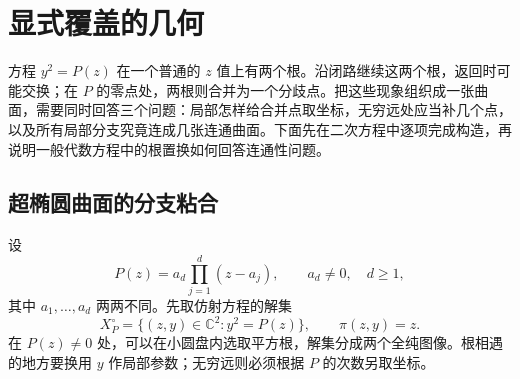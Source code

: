 
% 
% 
% 

\section{显式覆盖的几何}
\label{g4:sec:0204}

方程 \(y^2=P(z)\) 在一个普通的 \(z\) 值上有两个根。沿闭路继续这两个根，返回时可能交换；在 \(P\) 的零点处，两根则合并为一个分歧点。把这些现象组织成一张曲面，需要同时回答三个问题：局部怎样给合并点取坐标，无穷远处应当补几个点，以及所有局部分支究竟连成几张连通曲面。下面先在二次方程中逐项完成构造，再说明一般代数方程中的根置换如何回答连通性问题。

\subsection{超椭圆曲面的分支粘合}
\label{g4:subsec:0204:01}

设
\[
	P(z)=a_d\prod_{j=1}^d(z-a_j),\qquad a_d\ne0,\quad d\ge1,
\]
其中 \(a_1,\ldots,a_d\) 两两不同。先取仿射方程的解集
\[
	X_P^\circ=\{(z,y)\in\mathbb C^2:y^2=P(z)\},
	\qquad \pi(z,y)=z.
\]
在 \(P(z)\ne0\) 处，可以在小圆盘内选取平方根，解集分成两个全纯图像。根相遇的地方要换用 \(y\) 作局部参数；无穷远则必须根据 \(P\) 的次数另取坐标。

